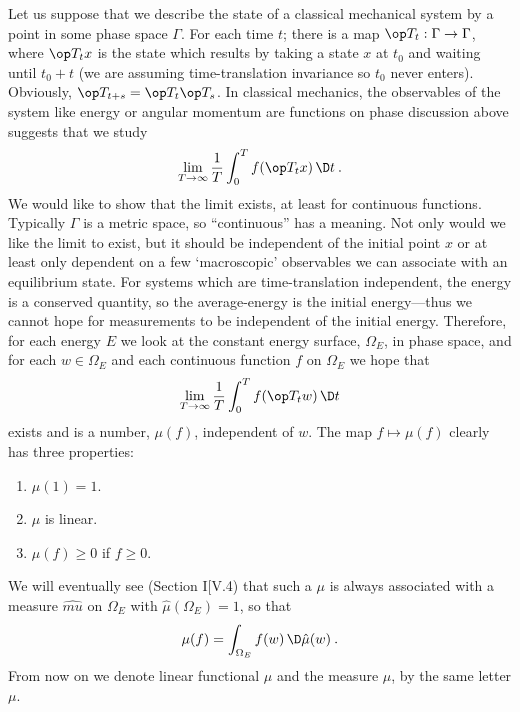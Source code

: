 Let us suppose that we describe the state of a classical mechanical system by a point in some phase space $\Gamma$. For each time $t$; there is a map $\op T_t : \Gamma \to \Gamma$, where $\op T_t x$ is the state which results by taking a state $x$ at $t_0$ and waiting until $t_0 + t$ (we are assuming time-translation invariance so $t_0$ never enters).
Obviously, $\op T_{t+s} = \op T_t \op T_s$. In classical mechanics, the observables of the system like energy or angular momentum are functions on phase discussion above suggests that we study
\begin{align}
    \lim_{T \rightarrow \infty} \frac{1}{T} \int_0^T f(\op T_t x) \, \D t \:.
\end{align}
We would like to show that the limit exists, at least for continuous functions. Typically $\Gamma$ is a metric space, so \enquote{continuous} has a meaning. Not only would we like the limit to exist, but it should be independent of the initial point $x$ or at least only dependent on a few \enquote*{macroscopic} observables we can associate with an equilibrium state. For systems which are time-translation independent, the energy is a conserved quantity, so the average-energy is the initial energy—thus we cannot hope for measurements to be independent of the initial energy. Therefore, for each energy $E$ we look at the constant energy surface, $\Omega_E$, in phase space, and for each  $w \in \Omega_E$ and each continuous function $f$ on $\Omega_E$ we hope that
\begin{align}
    \lim_{T \rightarrow \infty} \frac{1}{T} \int_0^T f(\op T_t w) \, \D t
\end{align}
exists and is a number, $\mu(f)$, independent of $w$. The map $f \mapsto \mu(f)$ clearly has three properties:
\begin{enumerate}
    \item $\mu(1)=1$.
    \item $\mu$ is linear.
    \item $\mu(f) \geq 0$ if $f \geq 0$.
\end{enumerate}
We will eventually see (Section I[V.4) that such a $\mu$ is always associated with a measure $\hat{mu}$ on $\Omega_E$ with $\hat{\mu}(\Omega_E) = 1$, so that
\begin{align}
    \mu(f) = \int_{\Omega_E} f(w) \, \D \hat{\mu}(w) \:.
\end{align}
From now on we denote linear functional $\mu$ and the measure $\hat{\mu}$, by the same letter $\mu$.


